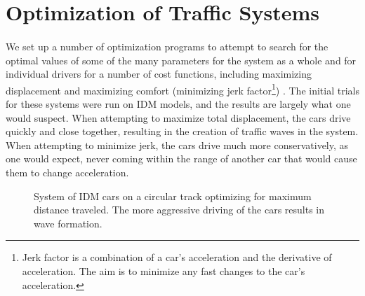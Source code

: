 \documentclass[12pt]{article}
\begin{document}
\section{Optimization of Traffic Systems}
\paragraph{}We set up a number of optimization programs to attempt to search for the optimal values of some of the many parameters for the system as a whole and for individual drivers for a number of cost functions, including maximizing displacement and maximizing comfort (minimizing jerk factor\footnote{Jerk factor is a combination of a car's acceleration and the derivative of acceleration. The aim is to minimize any fast changes to the car's acceleration.}) \cite[Chapter~21]{treiber_kesting_2013}. The initial trials for these systems were run on IDM models, and the results are largely what one would suspect. When attempting to maximize total displacement, the cars drive quickly and close together, resulting in the creation of traffic waves in the system. When attempting to minimize jerk, the cars drive much more conservatively, as one would expect, never coming within the range of another car that would cause them to change acceleration. \\

\begin{figure}[H]
  \centering
  \caption{System of IDM cars on a circular track optimizing for maximum distance traveled. The more aggressive driving of the cars results in wave formation.}
\end{figure}
\end{document}
